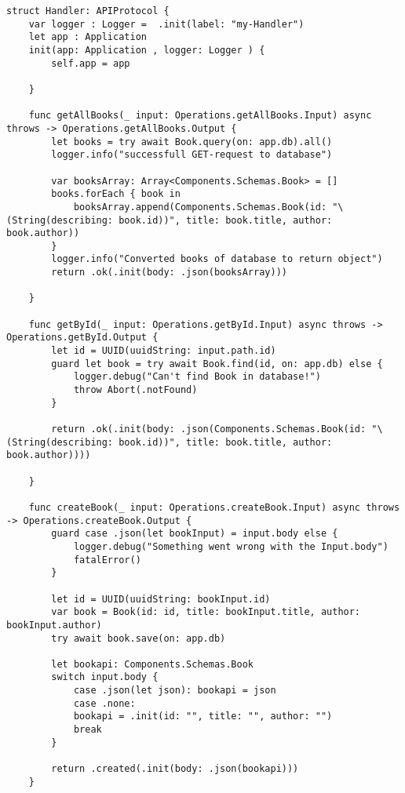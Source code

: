 \begin{lstlisting}[caption=handler file]
struct Handler: APIProtocol {
    var logger : Logger =  .init(label: "my-Handler")
    let app : Application
    init(app: Application , logger: Logger ) {
        self.app = app
        
    }
    
    func getAllBooks(_ input: Operations.getAllBooks.Input) async throws -> Operations.getAllBooks.Output {
        let books = try await Book.query(on: app.db).all()
        logger.info("successfull GET-request to database")
        
        var booksArray: Array<Components.Schemas.Book> = []
        books.forEach { book in
            booksArray.append(Components.Schemas.Book(id: "\(String(describing: book.id))", title: book.title, author: book.author))
        }
        logger.info("Converted books of database to return object")
        return .ok(.init(body: .json(booksArray)))
        
    }
    
    func getById(_ input: Operations.getById.Input) async throws -> Operations.getById.Output {
        let id = UUID(uuidString: input.path.id)
        guard let book = try await Book.find(id, on: app.db) else {
            logger.debug("Can't find Book in database!")
            throw Abort(.notFound)
        }
        
        return .ok(.init(body: .json(Components.Schemas.Book(id: "\(String(describing: book.id))", title: book.title, author: book.author))))
        
    }

    func createBook(_ input: Operations.createBook.Input) async throws -> Operations.createBook.Output {
        guard case .json(let bookInput) = input.body else {
            logger.debug("Something went wrong with the Input.body")
            fatalError()
        }
        
        let id = UUID(uuidString: bookInput.id)
        var book = Book(id: id, title: bookInput.title, author: bookInput.author)
        try await book.save(on: app.db)
        
        let bookapi: Components.Schemas.Book
        switch input.body {
            case .json(let json): bookapi = json
            case .none:
            bookapi = .init(id: "", title: "", author: "")
            break
        }
        
        return .created(.init(body: .json(bookapi)))
    }
    

\end{lstlisting}
